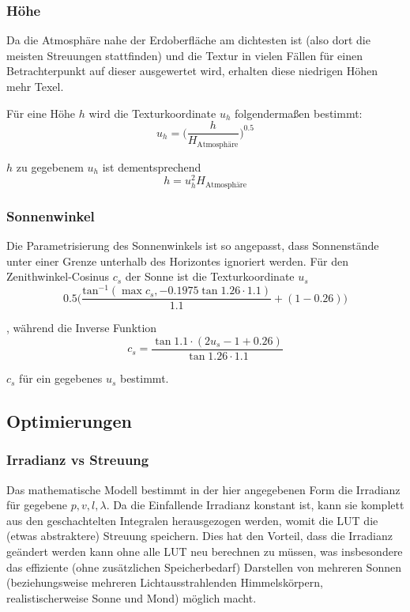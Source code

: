 \subsubsection{Höhe}
Da die Atmosphäre nahe der Erdoberfläche am dichtesten ist (also dort die meisten Streuungen stattfinden) und die Textur
in vielen Fällen für einen Betrachterpunkt auf dieser ausgewertet wird, erhalten diese niedrigen Höhen mehr Texel.

Für eine Höhe $h$ wird die Texturkoordinate $u_h$ folgendermaßen bestimmt:
\begin{equation*}
	u_h = \Big(\frac{h}{H_{\text{Atmosphäre}}}\Big)^{0.5}
\end{equation*}

$h$ zu gegebenem $u_h$ ist dementsprechend
\begin{equation*}
	h = u_h^2H_{\text{Atmosphäre}}
\end{equation*}

\subsubsection{Sonnenwinkel}
Die Parametrisierung des Sonnenwinkels ist so angepasst, dass Sonnenstände unter einer Grenze unterhalb des Horizontes
ignoriert werden. Für den Zenithwinkel-Cosinus $c_s$ der Sonne ist die Texturkoordinate $u_s$
\begin{equation*}
	0.5 \Big(\frac{\text{tan}^{-1}(\max{c_s, -0.1975}\tan{1.26 \cdot 1.1})}{1.1}+(1-0.26)\Big)
\end{equation*}

, während die Inverse Funktion
\begin{equation*}
	c_s = \frac{\tan{1.1 \cdot (2u_s-1+0.26)}}{\tan{1.26 \cdot 1.1}}
\end{equation*}

$c_s$ für ein gegebenes $u_s$ bestimmt.

\subsection{Optimierungen}

\subsubsection{Irradianz vs Streuung}
Das mathematische Modell bestimmt in der hier angegebenen Form die Irradianz für gegebene $p,v,l,\lambda$. Da die
Einfallende Irradianz konstant ist, kann sie komplett aus den geschachtelten Integralen herausgezogen werden, womit die
LUT die (etwas abstraktere) Streuung speichern. Dies hat den Vorteil, dass die Irradianz geändert werden kann ohne alle
LUT neu berechnen zu müssen, was insbesondere das effiziente (ohne zusätzlichen Speicherbedarf) Darstellen von mehreren
Sonnen (beziehungsweise mehreren Lichtausstrahlenden Himmelskörpern, realistischerweise Sonne und Mond) möglich macht.

